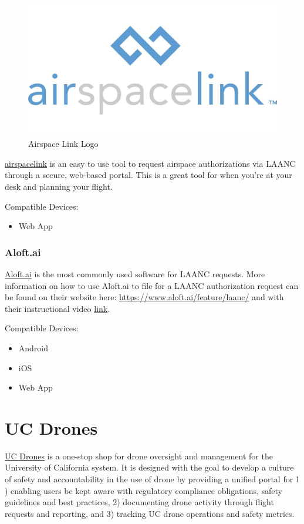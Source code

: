 \documentclass[
  12pt,
]{book}
\providecommand{\tightlist}{%
  \setlength{\itemsep}{0pt}\setlength{\parskip}{0pt}}
\begin{document}
\begin{figure}

{\centering \includegraphics[width=0.5\linewidth]{images/airspace_link} 

}

\caption{Airspace Link Logo}\label{fig:airspacelink}
\end{figure}

\href{https://airspacelink.com/}{airspacelink} is an easy to use tool to request airspace authorizations via LAANC through a secure, web-based portal. This is a great tool for when you're at your desk and planning your flight.

Compatible Devices:

\begin{itemize}
\tightlist
\item
  Web App
\end{itemize}

\subsection{Aloft.ai}\label{aloft.ai}

\href{https://www.aloft.ai/}{Aloft.ai} is the most commonly used software for LAANC requests. More information on how to use Aloft.ai to file for a LAANC authorization request can be found on their website here: \url{https://www.aloft.ai/feature/laanc/} and with their instructional video \href{https://www.youtube.com/watch?v=kVl7R0XWz2k&ab_channel=Aloft}{link}.

Compatible Devices:

\begin{itemize}
\tightlist
\item
  Android
\item
  iOS
\item
  Web App
\end{itemize}

\chapter{UC Drones}\label{UCdrones}

\href{http://ehs.ucop.edu/drones}{UC Drones} is a one-stop shop for drone oversight and management for the University of California system. It is designed with the goal to develop a culture of safety and accountability in the use of drone by providing a unified portal for 1 ) enabling users be kept aware with regulatory compliance obligations, safety guidelines and best practices, 2) documenting drone activity through flight requests and reporting, and 3) tracking UC drone operations and safety metrics.
\end{document}
